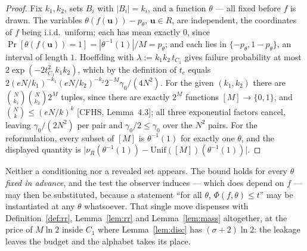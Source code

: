 \documentclass{aicr-solution}
\newcommand{\Prob}[1]{\Pr\!\left[#1\right]}
\newcommand{\bits}{\{0,1\}}
\newcommand{\vu}{\mathbf{u}}
\newcommand{\Unif}{\mathrm{Unif}}
\begin{document}
\begin{proof}
Fix $k_1,k_2$, sets $B_i$ with $|B_i|=k_i$, and a function $\theta$ --- all fixed
before $f$ is drawn. The variables $\theta(f(\vu))-p_\theta$, $\vu\in R$, are
independent, the coordinates of $f$ being i.i.d.\ uniform; each has mean exactly
$0$, since $\Prob{\theta(f(\vu))=1}=|\theta^{-1}(1)|/M=p_\theta$; and each lies in
$\{-p_\theta,1-p_\theta\}$, an interval of length $1$. Hoeffding with
$\lambda:=k_1k_2\,t_{C_1}$ gives failure probability at most
$2\exp(-2t_{C_1}^{2}k_1k_2)$, which by the definition of $t_c$ equals
$2(eN/k_1)^{-k_1}(eN/k_2)^{-k_2}2^{-M}\gamma_0/(4N^{2})$. For the given
$(k_1,k_2)$ there are $\binom{N}{k_1}\binom{N}{k_2}2^{M}$ tuples, since there are
exactly $2^{M}$ functions $[M]\to\bits$, and $\binom Nk\le(eN/k)^{k}$
[CFHS, Lemma~4.3]; all three exponential factors cancel, leaving
$\gamma_0/(2N^{2})$ per pair and $\gamma_0/2\le\gamma_0$ over the $N^{2}$ pairs.
For the reformulation, every subset of $[M]$ is $\theta^{-1}(1)$ for exactly one
$\theta$, and the displayed quantity is
$\bigl|\nu_R(\theta^{-1}(1))-\Unif([M])(\theta^{-1}(1))\bigr|$.
\end{proof}

Neither a conditioning nor a revealed set appears. The bound holds for every
$\theta$ \emph{fixed in advance}, and the test the observer induces --- which does
depend on $f$ --- may then be substituted, because a statement ``for all $\theta$,
$\Phi(f,\theta)\le t$'' may be instantiated at any $\theta$ whatsoever. That single
move dispenses with Definition~\ref{def:rr}, Lemma~\ref{lem:rr} and
Lemma~\ref{lem:mass} altogether, at the price of $M\ln2$ inside $C_1$ where
Lemma~\ref{lem:disc} has $(\sigma+2)\ln2$: the leakage leaves the budget and the
alphabet takes its place.
\end{document}
